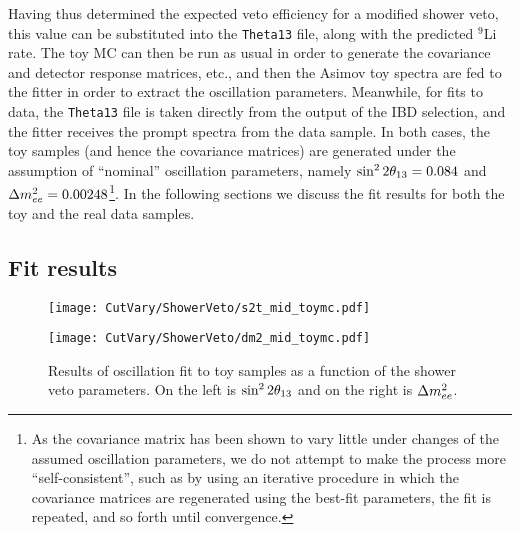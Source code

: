 \documentclass[../thesis.tex]{subfiles}
\begin{document}
Having thus determined the expected veto efficiency for a modified shower veto, this value can be substituted into the \texttt{Theta13} file, along with the predicted $^9$Li rate. The toy MC can then be run as usual in order to generate the covariance and detector response matrices, etc., and then the Asimov toy spectra are fed to the fitter in order to extract the oscillation parameters. Meanwhile, for fits to data, the \texttt{Theta13} file is taken directly from the output of the IBD selection, and the fitter receives the prompt spectra from the data sample. In both cases, the toy samples (and hence the covariance matrices) are generated under the assumption of ``nominal'' oscillation parameters, namely $\sin^2 2\theta_{13} = 0.084$ and $\Delta m^2_{ee} = 0.00248$\footnote{As the covariance matrix has been shown to vary little under changes of the assumed oscillation parameters, we do not attempt to make the process more ``self-consistent'', such as by using an iterative procedure in which the covariance matrices are regenerated using the best-fit parameters, the fit is repeated, and so forth until convergence.}. In the following sections we discuss the fit results for both the toy and the real data samples.

\begin{comment}
Regarding results: Don't comment on ``structure'' until we've regenerated the 2D plots using the fix to SinglesCalc::calcSinglesHz. (Accidentals rate might have been biased, throwing off the fit.)
\end{comment}

\subsection{Fit results}%
\label{sec:cutVaryMuVetoDataResults}

\begin{figure}[ht]
  \begin{minipage}{0.5\linewidth}%
    \texttt{[image: CutVary/ShowerVeto/s2t\_mid\_toymc.pdf]}%
  \end{minipage}%
  \begin{minipage}{0.5\linewidth}%
    \texttt{[image: CutVary/ShowerVeto/dm2\_mid\_toymc.pdf]}%
  \end{minipage}%
  \caption{Results of oscillation fit to toy samples as a function of the shower veto parameters. On the left is $\sin^2 2\theta_{13}$ and on the right is $\Delta m^2_{ee}$.}
  \label{fig:cutVaryVetoEffToyResults}
\end{figure}
\end{document}
